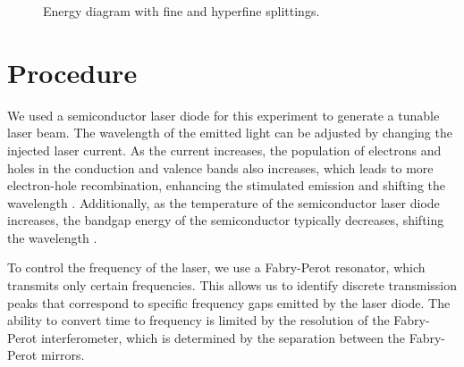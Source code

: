 \documentclass{../paper}
\begin{document}
\begin{figure}
  \centering

  \caption{Energy diagram with fine and hyperfine splittings.}
  \label{fig:splittings}
\end{figure}

\section{Procedure}

We used a semiconductor laser diode for this experiment to generate a tunable laser beam. The wavelength of the emitted light can be adjusted by changing the injected laser current. As the current increases, the population of electrons and holes in the conduction and valence bands also increases, which leads to more electron-hole recombination, enhancing the stimulated emission and shifting the wavelength \cite{Svelto}. Additionally, as the temperature of the semiconductor laser diode increases, the bandgap energy of the semiconductor typically decreases, shifting the wavelength \cite{Svelto}.

To control the frequency of the laser, we use a Fabry-Perot resonator, which transmits only certain frequencies. This allows us to identify discrete transmission peaks that correspond to specific frequency gaps emitted by the laser diode. The ability to convert time to frequency is limited by the resolution of the Fabry-Perot interferometer, which is determined by the separation between the Fabry-Perot mirrors.
\end{document}
